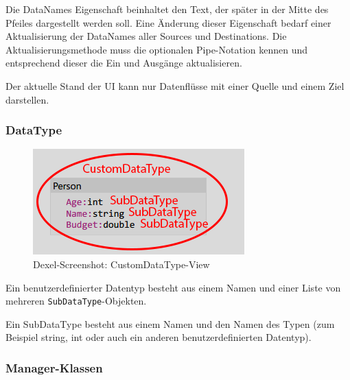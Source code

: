 Die DataNames Eigenschaft beinhaltet den Text, der später in der Mitte des
Pfeiles dargestellt werden soll. Eine Änderung dieser Eigenschaft bedarf
einer Aktualisierung der DataNames aller Sources und Destinations.
Die Aktualisierungsmethode muss die optionalen Pipe-Notation kennen und
entsprechend dieser die Ein und Ausgänge aktualisieren.

Der aktuelle Stand der UI kann nur Datenflüsse mit einer Quelle und
einem Ziel darstellen.

\subsubsection{DataType}


\begin{figure}[H]
	\centering
	\includegraphics[width=0.5\linewidth]{./img/CustomDataType.png} 
	\caption{Dexel-Screenshot: CustomDataType-View}
\end{figure}


Ein benutzerdefinierter Datentyp besteht aus einem Namen und einer Liste von mehreren
\texttt{SubDataType}-Objekten. 

Ein SubDataType besteht aus einem Namen und den Namen
des Typen (zum Beispiel string, int oder auch ein anderen benutzerdefinierten
Datentyp).

\subsubsection{Manager-Klassen}

